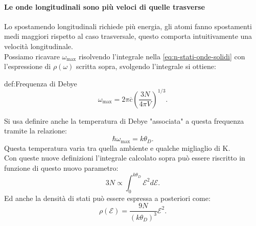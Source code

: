 \paragraph{Le onde longitudinali sono più veloci di quelle trasverse}
Lo spostamendo longitudinali richiede più energia, gli atomi fanno spostamenti medi maggiori rispetto al caso trasversale, questo comporta intuitivamente una velocità longitudinale.\\
Possiamo ricavare $\omega _\text{max} $ risolvendo l'integrale nella \ref{eq:n-stati-onde-solidi} con l'espressione di $\rho ( \omega ) $ scritta sopra, svolgendo l'integrale si ottiene:
\begin{defn}{def:Frequenza di Debye}
	\[
	\omega _\text{max} 
	=
	2\pi \overline{c} 
	\left( \frac{3N}{4\pi V} \right)^{1/3}
	.\]
\end{defn}
Si usa definire anche la temperatura di Debye "associata" a questa frequenza tramite la relazione:
\[
	\hbar\omega _\text{max} 
	=
	k \theta _D
.\] 
Questa temperatura varia tra quella ambiente e qualche migliaglio di K.\\
Con queste nuove definizioni l'integrale calcolato sopra può essere riscritto in funzione di questo nuovo parametro:
\[
	3N \propto \int_{0 }^{k \theta _D} \mathcal{E} ^2 d\mathcal{E}  
.\] 
Ed anche la densità di stati può essere espressa a posteriori come:
\[
	\rho ( \mathcal{E} ) 
	=
	\frac{9N}{\left( k\theta _D \right)^3}\mathcal{E}^2
.\] 
